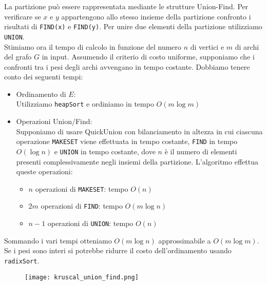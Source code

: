 \noindent La partizione può essere rappresentata mediante le strutture Union-Find. Per 
verificare se $x$ e $y$ appartengono allo stesso insieme della partizione confronto i risultati di 
\texttt{FIND(x)} e \texttt{FIND(y)}. Per unire due elementi della partizione utilizziamo \texttt{UNION}.\\
Stimiamo ora il tempo di calcolo in funzione del numero $n$ di vertici e $m$ di archi del grafo $G$ in input.
Assumendo il criterio di costo uniforme, supponiamo che i confronti tra i pesi degli archi avvengano in tempo costante. Dobbiamo tenere conto dei seguenti tempi:
\begin{itemize}
    \item Ordinamento di $E$:\\
    Utilizziamo \texttt{heapSort} e ordiniamo in tempo $O(m \log m)$
    \item Operazioni Union/Find:\\
    Supponiamo di usare QuickUnion con bilanciamento in altezza in cui ciascuna
    operazione \texttt{MAKESET} viene effettuata in tempo costante, \texttt{FIND} in tempo $O(\log n)$
    e \texttt{UNION} in tempo costante, dove $n$ è il numero di elementi presenti
    complessivamente negli insiemi della partizione. L'algoritmo effettua queste operazioni:
    \begin{itemize}
        \item $n$ operazioni di \texttt{MAKESET}: tempo $O(n)$
        \item $2m$ operazioni di \texttt{FIND}: tempo $O(m \log n)$
        \item $n - 1$ operazioni di \texttt{UNION}: tempo $O(n)$
    \end{itemize}
\end{itemize}

\noindent Sommando i vari tempi otteniamo $O(m \log n)$ approssimabile a $O(m \log m)$.
Se i pesi sono interi si potrebbe ridurre il costo dell'ordinamento usando \texttt{radixSort}.
\begin{figure}[h]
    \texttt{[image: kruscal\_union\_find.png]}
\end{figure}
\clearpage

